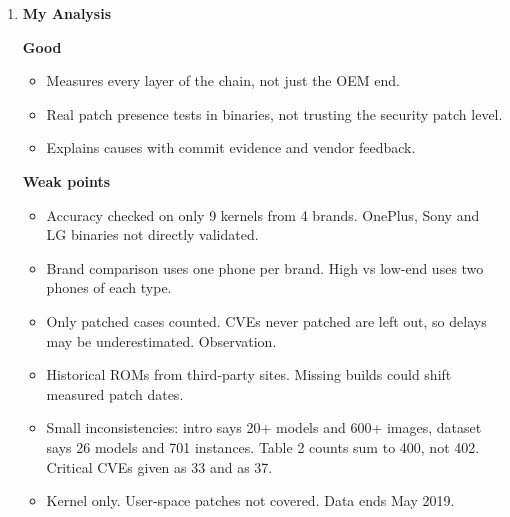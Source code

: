 \documentclass[11pt,a4paper]{article}
\newcommand{\entrypart}[1]{\textbf{\color{accent}#1}\par\vspace{2pt}}
\begin{document}
\begin{enumerate}
    \vspace{4pt}
    \textbf{Limitations (authors)}
    \begin{itemize}
        \item Missing patch does not mean vulnerable (function may be customized). So only patched cases are analyzed.
        \item Delay measured to build date. Carrier certification and user delays out of scope.
        \item Only Qualcomm. MediaTek, Kirin, Exynos have no full git repos and no patch links.
        \item Source matcher has false negatives on customized functions.
        \item About 10\% of CVEs excluded from binary tests.
        \item Region and carrier analysis based on small samples.
    \end{itemize}

    \item \entrypart{My Analysis}

    \textbf{Good}
    \begin{itemize}
        \item Measures every layer of the chain, not just the OEM end.
        \item Real patch presence tests in binaries, not trusting the security patch level.
        \item Explains causes with commit evidence and vendor feedback.
    \end{itemize}

    \vspace{4pt}
    \textbf{Weak points}
    \begin{itemize}
        \item Accuracy checked on only 9 kernels from 4 brands. OnePlus, Sony and LG binaries not directly validated.
        \item Brand comparison uses one phone per brand. High vs low-end uses two phones of each type.
        \item Only patched cases counted. CVEs never patched are left out, so delays may be underestimated. Observation.
        \item Historical ROMs from third-party sites. Missing builds could shift measured patch dates.
        \item Small inconsistencies: intro says 20+ models and 600+ images, dataset says 26 models and 701 instances. Table 2 counts sum to 400, not 402. Critical CVEs given as 33 and as 37.
        \item Kernel only. User-space patches not covered. Data ends May 2019.
    \end{itemize}


\end{enumerate}
\end{document}
